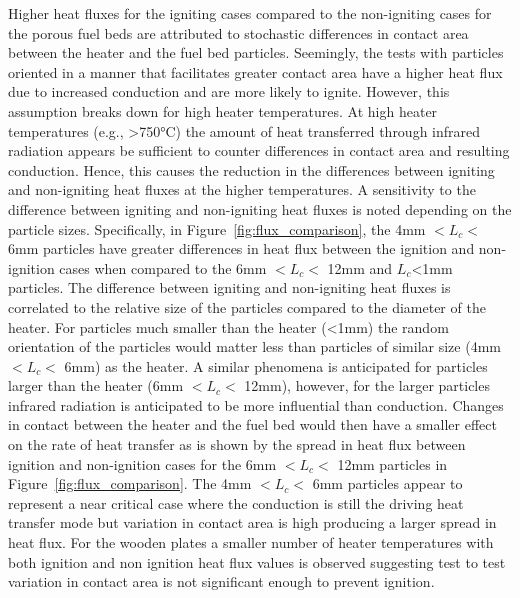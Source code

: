      Higher heat fluxes for the igniting cases compared to the non-igniting cases for the porous fuel beds are attributed to stochastic differences in contact area between the heater and the fuel bed particles. Seemingly, the tests with particles oriented in a manner that facilitates greater contact area have a higher heat flux due to increased conduction and are more likely to ignite. However, this assumption breaks down for high heater temperatures. At high heater temperatures (e.g., \textgreater750\si{\celsius}) the amount of heat transferred through infrared radiation appears be sufficient to counter differences in contact area and resulting conduction. Hence, this causes the reduction in the differences between igniting and non-igniting heat fluxes at the higher temperatures.  A sensitivity to the difference between igniting and non-igniting heat fluxes is noted depending on the particle sizes.  Specifically, in Figure~\ref{fig:flux_comparison}, the 4\si{\milli\meter} $<L_{c}<$ 6\si{\milli\meter} particles have greater differences in heat flux between the ignition and non-ignition cases when compared to the 6\si{\milli\meter} $<L_{c}<$ 12\si{\milli\meter} and $L_{c}$\textless1mm particles. The difference between igniting and non-igniting heat fluxes is correlated to the relative size of the particles compared to the diameter of the heater. For particles much smaller than the heater (\textless1\si{\milli\meter}) the random orientation of the particles would matter less than particles of similar size (4\si{\milli\meter} $<L_{c}<$ 6\si{\milli\meter}) as the heater. A similar phenomena is anticipated for particles larger than the heater (6\si{\milli\meter} $<L_{c}<$ 12\si{\milli\meter}), however, for the larger particles infrared radiation is anticipated to be more influential than conduction. Changes in contact between the heater and the fuel bed would then have a smaller effect on the rate of heat transfer as is shown by the spread in heat flux between ignition and non-ignition cases for the 6\si{\milli\meter} $<L_{c}<$ 12\si{\milli\meter} particles in Figure~\ref{fig:flux_comparison}. The 4\si{\milli\meter} $<L_{c}<$ 6\si{\milli\meter} particles appear to represent a near critical case where the conduction is still the driving heat transfer mode but variation in contact area is high producing a larger spread in heat flux.
     For the wooden plates a smaller number of heater temperatures with both ignition and non ignition heat flux values is observed suggesting test to test variation in contact area is not significant enough to prevent ignition.


